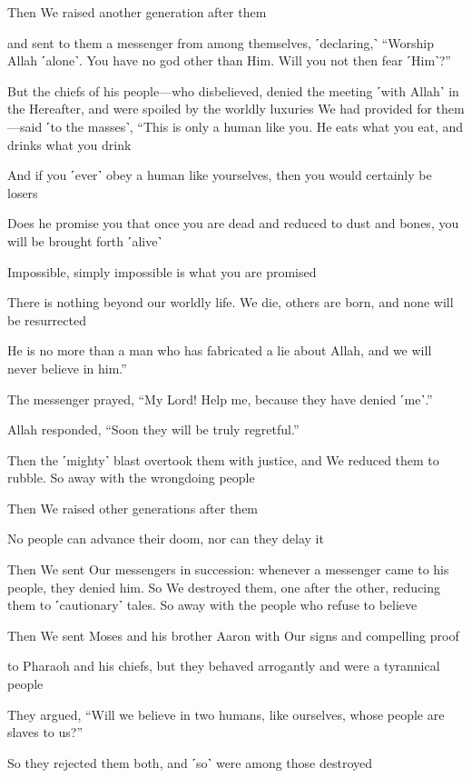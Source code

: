 Then We raised another generation after them

and sent to them a messenger from among themselves, ˹declaring,˺ “Worship Allah ˹alone˺. You have no god other than Him. Will you not then fear ˹Him˺?”

But the chiefs of his people—who disbelieved, denied the meeting ˹with Allah˺ in the Hereafter, and were spoiled by the worldly luxuries We had provided for them—said ˹to the masses˺, “This is only a human like you. He eats what you eat, and drinks what you drink

And if you ˹ever˺ obey a human like yourselves, then you would certainly be losers

Does he promise you that once you are dead and reduced to dust and bones, you will be brought forth ˹alive˺

Impossible, simply impossible is what you are promised

There is nothing beyond our worldly life. We die, others are born, and none will be resurrected

He is no more than a man who has fabricated a lie about Allah, and we will never believe in him.”

The messenger prayed, “My Lord! Help me, because they have denied ˹me˺.”

Allah responded, “Soon they will be truly regretful.”

Then the ˹mighty˺ blast overtook them with justice, and We reduced them to rubble. So away with the wrongdoing people

Then We raised other generations after them

No people can advance their doom, nor can they delay it

Then We sent Our messengers in succession: whenever a messenger came to his people, they denied him. So We destroyed them, one after the other, reducing them to ˹cautionary˺ tales. So away with the people who refuse to believe

Then We sent Moses and his brother Aaron with Our signs and compelling proof

to Pharaoh and his chiefs, but they behaved arrogantly and were a tyrannical people

They argued, “Will we believe in two humans, like ourselves, whose people are slaves to us?”

So they rejected them both, and ˹so˺ were among those destroyed

